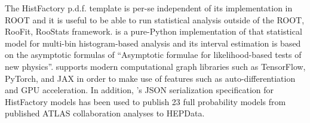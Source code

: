 The HistFactory p.d.f. template is per-se independent of its implementation in ROOT and it is useful to be able to run statistical analysis outside of the ROOT, RooFit, RooStats framework.
\pyhf{} is a pure-Python implementation of that statistical model for multi-bin histogram-based analysis and its interval estimation is based on the asymptotic formulas of ``Asymptotic formulae for likelihood-based tests of new physics''.
\pyhf{} supports modern computational graph libraries such as TensorFlow, PyTorch, and JAX in order to make use of features such as auto-differentiation and GPU acceleration.
In addition, \pyhf{}'s JSON serialization specification for HistFactory models has been used to publish 23 full probability models from published ATLAS collaboration analyses to HEPData.
